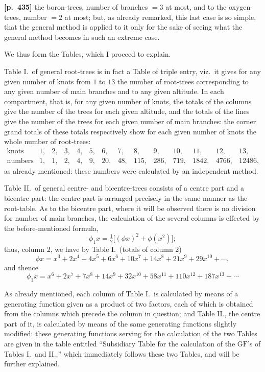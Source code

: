 \documentclass[11pt,a4paper]{article}
\providecommand{\GF}{\mathrm{GF}}
\begin{document}
\bigskip
\noindent\textbf{[p.~435]}\quad
the boron-trees, number of branches $=3$ at most, and to the oxygen-trees, number $=2$ at most; but, as already remarked, this last case is so simple, that the general method is applied to it only for the sake of seeing what the general method becomes in such an extreme case.

We thus form the Tables, which I proceed to explain.

Table I.\ of general root-trees is in fact a Table of triple entry, viz.\ it gives for any given number of knots from $1$ to $13$ the number of root-trees corresponding to any given number of main branches and to any given altitude. In each compartment, that is, for any given number of knots, the totals of the columns give the number of the trees for each given altitude, and the totals of the lines give the number of the trees for each given number of main branches: the corner grand totals of these totals respectively show for each given number of knots the whole number of root-trees:
\[
\begin{array}{lccccccccccccc}
\text{knots} & 1, & 2, & 3, & 4, & 5, & 6, & 7, & 8, & 9, & 10, & 11, & 12, & 13,\\
\text{numbers are} & 1, & 1, & 2, & 4, & 9, & 20, & 48, & 115, & 286, & 719, & 1842, & 4766, & 12486,
\end{array}
\]
as already mentioned: these numbers were calculated by an independent method.

Table II.\ of general centre- and bicentre-trees consists of a centre part and a bicentre part: the centre part is arranged precisely in the same manner as the root-table. As to the bicentre part, where it will be observed there is no division for number of main branches, the calculation of the several columns is effected by the before-mentioned formula,
\[
\phi_{1}x = \tfrac{1}{2}\bigl[(\phi x)^{2} + \phi(x^{2})\bigr];
\]
thus, column 2, we have by Table I.\ (totals of column 2)
\[
\phi x = x^{3} + 2x^{4} + 4x^{5} + 6x^{6} + 10x^{7} + 14x^{8} + 21x^{9} + 29x^{10} + \cdots,
\]
and thence
\[
\phi_{1}x = x^{6} + 2x^{7} + 7x^{8} + 14x^{9} + 32x^{10} + 58x^{11} + 110x^{12} + 187x^{13} + \cdots
\]

As already mentioned, each column of Table I.\ is calculated by means of a generating function given as a product of two factors, each of which is obtained from the columns which precede the column in question; and Table II., the centre part of it, is calculated by means of the same generating functions slightly modified: these generating functions serving for the calculation of the two Tables are given in the table entitled ``Subsidiary Table for the calculation of the $\GF$'s of Tables I.\ and II.,'' which immediately follows these two Tables, and will be further explained.
\end{document}
